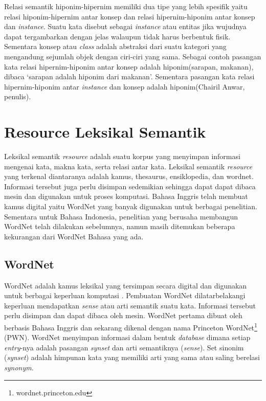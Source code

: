 Relasi semantik hiponim-hipernim memiliki dua tipe yang lebih spesifik yaitu relasi hiponim-hipernim antar konsep dan relasi hipernim-hiponim antar konsep dan \textit{instance}. Suatu kata disebut sebagai \textit{instance} atau entitas jika wujudnya dapat tergambarkan dengan jelas walaupun tidak harus berbentuk fisik. Sementara konsep atau \textit{class} adalah abstraksi dari suatu kategori yang mengandung sejumlah objek dengan ciri-ciri yang sama. Sebagai contoh pasangan kata relasi hipernim-hiponim antar konsep adalah hiponim(sarapan, makanan), dibaca `sarapan adalah hiponim dari makanan'. Sementara pasangan kata relasi hipernim-hiponim antar \textit{instance} dan konsep adalah hiponim(Chairil Anwar, penulis).


\section{Resource Leksikal Semantik}
Leksikal semantik \textit{resource} adalah suatu korpus yang menyimpan informasi mengenai kata, makna kata, serta relasi antar kata. Leksikal semantik \textit{resource} yang terkenal diantaranya adalah kamus, thesaurus, ensiklopedia, dan wordnet. Informasi tersebut juga perlu disimpan sedemikian sehingga dapat dapat dibaca mesin dan digunakan untuk proses komputasi. Bahasa Inggris telah membuat kamus digital yaitu WordNet yang banyak digunakan untuk berbagai penelitian. Sementara untuk Bahasa Indonesia, penelitian yang berusaha membangun WordNet telah dilakukan sebelumnya, namun masih ditemukan beberapa kekurangan dari WordNet Bahasa yang ada. 

\subsection{WordNet}
WordNet adalah kamus leksikal yang tersimpan secara digital dan digunakan untuk berbagai keperluan komputasi \citep{miller1995wordnet}. Pembuatan WordNet dilatarbelakangi keperluan mendapatkan \textit{sense} atau arti semantik suatu kata. Informasi tersebut perlu disimpan dan dapat dibaca oleh mesin. WordNet pertama dibuat oleh \cite{miller1995wordnet} berbasis Bahasa Inggris dan sekarang dikenal dengan nama Princeton WordNet\footnote{wordnet.princeton.edu} (PWN). WordNet menyimpan informasi dalam bentuk \textit{database} dimana setiap \textit{entry}-nya adalah pasangan \textit{synset} dan arti semantiknya (\textit{sense}). Set sinonim (\textit{synset}) adalah himpunan kata yang memiliki arti yang sama atau saling berelasi \textit{synonym}. 


